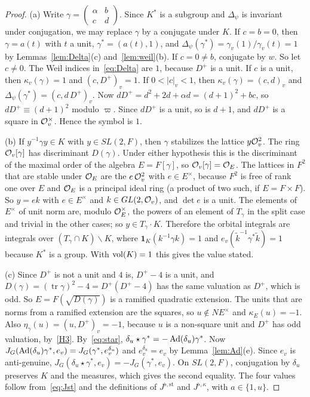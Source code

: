 \begin{proof}
(a) Write $\gamma=\begin{pmatrix}\alpha&b\\c&d\end{pmatrix}$. Since $K^*$ is
a subgroup and $\Delta_\psi$ is invariant under conjugation, we may
replace $\gamma$ by a conjugate under $K$. If $c=b=0$, then
$\gamma=a(t)$ with $t$ a unit, $\gamma^*=(a(t),1)$, and
$\Delta_\psi(\gamma^*)=\gamma_v(1)/\gamma_v(t)=1$ by
Lemmas~\ref{lem:Delta}(c) and~\ref{lem:weil}(b). If $c=0\ne b$, conjugate
by $w$. So let $c\ne0$. The Weil indices in~\eqref{eq:Delta} are $1$,
because $D^+$ is a unit. If $c$ is a unit, then $\kappa_v(\gamma)=1$ and
$(c,D^+)_v=1$. If $0<|c|_v<1$, then $\kappa_v(\gamma)=(c,d)_v$ and
$\Delta_\psi(\gamma^*)=(c,d\,D^+)_v$. Now $dD^+=d^2+2d+\alpha d=(d+1)^2+bc$,
so $dD^+\equiv(d+1)^2$ modulo $\varpi$. Since $dD^+$ is a unit, so is
$d+1$, and $dD^+$ is a square in $\mathcal{O}_v^\times$. Hence the symbol is $1$.

(b) If $y^{-1}\gamma y\in K$ with $y\in SL(2,F)$, then $\gamma$ stabilizes
the lattice $y\mathcal{O}_v^2$. The ring $\mathcal{O}_v[\gamma]$ has discriminant
$D(\gamma)$. Under either hypothesis this is the discriminant of the
maximal order of the algebra $E=F[\gamma]$, so $\mathcal{O}_v[\gamma]=\mathcal{O}_E$. The
lattices in $F^2$ that are stable under $\mathcal{O}_E$ are the $e\,\mathcal{O}_v^2$ with
$e\in E^\times$, because $F^2$ is free of rank one over $E$ and $\mathcal{O}_E$ is
a principal ideal ring (a product of two such, if $E=F\times F$). So
$y=ek$ with $e\in E^\times$ and $k\in GL(2,\mathcal{O}_v)$, and $\det e$ is a
unit. The elements of $E^\times$ of unit norm are, modulo $\mathcal{O}_E^\times$,
the powers of an element of $T_\gamma$ in the split case and trivial in
the other cases; so $y\in T_\gamma\cdot K$. Therefore the orbital
integrals are integrals over $(T_\gamma\cap K)\backslash K$, where
$\mathbf 1_K(k^{-1}\gamma k)=1$ and $e_v(\tilde k^{-1}\gamma^*\tilde k)=1$
because $K^*$ is a group. With $\operatorname{vol}(K)=1$ this gives the value stated.

(c) Since $D^+$ is not a unit and $4$ is, $D^+-4$ is a unit, and
$D(\gamma)=(\operatorname{tr}\gamma)^2-4=D^+(D^+-4)$ has the same
valuation as $D^+$, which is odd. So $E=F(\sqrt{D(\gamma)})$ is a ramified
quadratic extension. The units that are norms from a ramified extension
are the squares, so $u\notin N E^\times$ and $\kappa_E(u)=-1$. Also
$\eta_\gamma(u)=(u,D^+)_v=-1$, because $u$ is a non-square unit and $D^+$
has odd valuation, by~\ref{H3}. By~\eqref{eq:star},
$\delta_u\star\gamma^*=-\operatorname{Ad}(\delta_u)\gamma^*$. Now $J_G(\operatorname{Ad}(\delta_u)
\gamma^*,e_v)=J_G(\gamma^*,e_v^{\delta_u})$ and $e_v^{\delta_u}=e_v$ by
Lemma~\ref{lem:Ad}(e). Since $e_v$ is anti-genuine,
$J_G(\delta_u\star\gamma^*,e_v)=-J_G(\gamma^*,e_v)$. On $SL(2,F)$,
conjugation by $\delta_u$ preserves $K$ and the measures, which gives the
second equality. The four values follow from~\eqref{eq:Jst} and the
definitions of $J^{\flat,\mathrm{st}}$ and $J^{\flat,\kappa}$, with
$a\in\{1,u\}$.


\end{proof}

